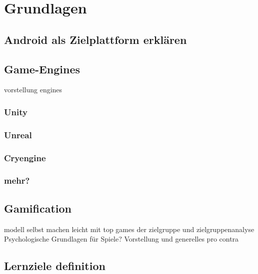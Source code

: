 \section{Grundlagen}
\subsection{Android als Zielplattform erklären}
\subsection{Game-Engines}
	vorstellung engines
	\subsubsection{Unity}
	\subsubsection{Unreal}
	\subsubsection{Cryengine}
	\subsubsection{mehr?}
\subsection{Gamification}
	modell selbst machen leicht mit top games der zielgruppe und zielgruppenanalyse
	Psychologische Grundlagen für Spiele?
	Vorstellung und generelles pro contra
\subsection{Lernziele definition}
